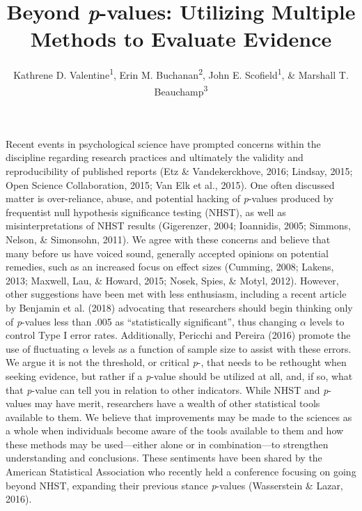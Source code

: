 \documentclass[english,man]{apa6}
\title{Beyond \emph{p}-values: Utilizing Multiple Methods to Evaluate Evidence}
\author{Kathrene D. Valentine\textsuperscript{1}, Erin M. Buchanan\textsuperscript{2}, John E. Scofield\textsuperscript{1}, \& Marshall T. Beauchamp\textsuperscript{3}}
\affiliation{
    \vspace{0.5cm}
          \textsuperscript{1} University of Missouri\\
          \textsuperscript{2} Missouri State University\\
          \textsuperscript{3} University of Missouri - Kansas City  }
\theoremstyle{definition}
\theoremstyle{definition}
\theoremstyle{definition}
\theoremstyle{remark}
\begin{document}
\maketitle

\setcounter{secnumdepth}{0}



Recent events in psychological science have prompted concerns within the
discipline regarding research practices and ultimately the validity and
reproducibility of published reports (Etz \& Vandekerckhove, 2016;
Lindsay, 2015; Open Science Collaboration, 2015; Van Elk et al., 2015).
One often discussed matter is over-reliance, abuse, and potential
hacking of \emph{p}-values produced by frequentist null hypothesis
significance testing (NHST), as well as misinterpretations of NHST
results (Gigerenzer, 2004; Ioannidis, 2005; Simmons, Nelson, \&
Simonsohn, 2011). We agree with these concerns and believe that many
before us have voiced sound, generally accepted opinions on potential
remedies, such as an increased focus on effect sizes (Cumming, 2008;
Lakens, 2013; Maxwell, Lau, \& Howard, 2015; Nosek, Spies, \& Motyl,
2012). However, other suggestions have been met with less enthusiasm,
including a recent article by Benjamin et al. (2018) advocating that
researchers should begin thinking only of \emph{p}-values less than .005
as \enquote{statistically significant}, thus changing \(\alpha\) levels
to control Type I error rates. Additionally, Pericchi and Pereira (2016)
promote the use of fluctuating \(\alpha\) levels as a function of sample
size to assist with these errors. We argue it is not the threshold, or
critical \emph{p}-, that needs to be rethought when seeking evidence,
but rather if a \emph{p}-value should be utilized at all, and, if so,
what that \emph{p}-value can tell you in relation to other indicators.
While NHST and \emph{p}-values may have merit, researchers have a wealth
of other statistical tools available to them. We believe that
improvements may be made to the sciences as a whole when individuals
become aware of the tools available to them and how these methods may be
used---either alone or in combination---to strengthen understanding and
conclusions. These sentiments have been shared by the American
Statistical Association who recently held a conference focusing on going
beyond NHST, expanding their previous stance \emph{p}-values
(Wasserstein \& Lazar, 2016).
\end{document}
